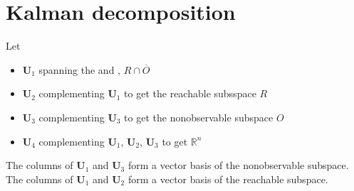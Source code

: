 \documentclass[letterpaper,10pt,english]{jupyterBook}
\begin{document}
\section{Kalman decomposition}
\label{\detokenize{ch/system-theory/kalman-decomposition:system-theory-kalman-decomposition-kalman}}\label{\detokenize{ch/system-theory/kalman-decomposition:id1}}
\sphinxAtStartPar
Let
\begin{itemize}
\item {} 
\sphinxAtStartPar
\(\mathbf{U}_1\) spanning the  and , \(R \cap \overline{O}\)

\item {} 
\sphinxAtStartPar
\(\mathbf{U}_2\) complementing \(\mathbf{U}_1\) to get the reachable sub\sphinxhyphen{}sspace \(R\)

\item {} 
\sphinxAtStartPar
\(\mathbf{U}_3\) complementing \(\mathbf{U}_3\) to get the non\sphinxhyphen{}observable sub\sphinxhyphen{}space \(O\)

\item {} 
\sphinxAtStartPar
\(\mathbf{U}_4\) complementing \(\mathbf{U}_1\), \(\mathbf{U}_2\), \(\mathbf{U}_3\) to get \(\mathbb{R}^n\)

\end{itemize}

\sphinxAtStartPar
The columns of \(\mathbf{U}_1\) and \(\mathbf{U}_3\) form a vector basis of the non\sphinxhyphen{}observable sub\sphinxhyphen{}space. The columns of \(\mathbf{U}_1\) and \(\mathbf{U}_2\) form a vector basis of the reachable subspace.
\end{document}
